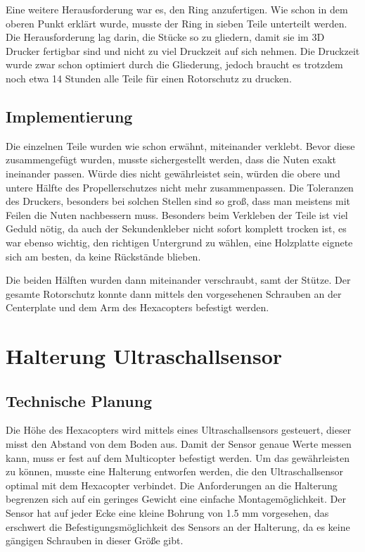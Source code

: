 	Eine weitere Herausforderung war es, den Ring anzufertigen. Wie schon in dem oberen Punkt erklärt wurde, musste der Ring in sieben Teile unterteilt werden.
	Die Herausforderung lag darin, die Stücke so zu gliedern, damit sie im 3D Drucker fertigbar sind und nicht zu viel Druckzeit auf sich nehmen.
	Die Druckzeit wurde zwar schon optimiert durch die Gliederung, jedoch braucht es trotzdem noch etwa 14 Stunden alle Teile für einen Rotorschutz zu drucken.

	\subsection{Implementierung}

Die einzelnen Teile wurden wie schon erwähnt, miteinander verklebt. Bevor diese zusammengefügt wurden, musste sichergestellt werden, dass die Nuten exakt ineinander passen.
Würde dies nicht gewährleistet sein, würden die obere und untere Hälfte des Propellerschutzes nicht mehr zusammenpassen.
Die Toleranzen des Druckers, besonders bei solchen Stellen sind so groß, dass man meistens mit Feilen die Nuten nachbessern muss.
Besonders beim Verkleben der Teile ist viel Geduld nötig, da auch der Sekundenkleber nicht sofort komplett trocken ist,
es war ebenso wichtig, den richtigen Untergrund zu wählen, eine Holzplatte eignete sich am besten, da keine Rückstände blieben.

Die beiden Hälften wurden dann miteinander verschraubt, samt der Stütze.
Der gesamte Rotorschutz konnte dann mittels den vorgesehenen Schrauben an der Centerplate und dem Arm des Hexacopters befestigt werden.

		\newpage

\section{Halterung Ultraschallsensor}

	\subsection{Technische Planung}

	Die Höhe des Hexacopters wird mittels eines Ultraschallsensors gesteuert, dieser misst den Abstand von dem Boden aus.
	Damit der Sensor genaue Werte messen kann, muss er fest auf dem Multicopter befestigt werden.
	Um das gewährleisten zu können, musste eine Halterung entworfen werden, die den Ultraschallsensor optimal mit dem Hexacopter verbindet.
	Die Anforderungen an die Halterung begrenzen sich auf ein geringes Gewicht \bzw eine einfache Montagemöglichkeit.
	Der Sensor hat auf jeder Ecke eine kleine Bohrung von 1.5 mm vorgesehen, das erschwert die Befestigungsmöglichkeit des Sensors an der Halterung, da es keine gängigen Schrauben in dieser Größe gibt.

